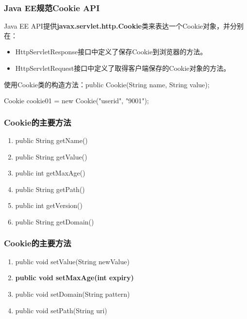 \begin{frame}[fragile] %
\frametitle{Java EE规范Cookie API} 

Java EE API提供{\bf javax.servlet.http.Cookie}类来表达一个Cookie对象，并分别在：

\begin{itemize}
\item HttpServletResponse接口中定义了保存Cookie到浏览器的方法。
\item HttpServletRequest接口中定义了取得客户端保存的Cookie对象的方法。
\end{itemize}


使用Cookie类的构造方法：public Cookie(String name, String value);
\begin{javaCode}
Cookie cookie01 = new Cookie("userid", "9001");
\end{javaCode}
\end{frame}

\begin{frame}[fragile] %
\frametitle{Cookie的主要方法} 
\begin{enumerate}
\item public String getName()
\item public String getValue()
\item public int getMaxAge()
\item public String getPath()
\item public int getVersion()
\item public String getDomain()
\end{enumerate}
\end{frame}

\begin{frame}[fragile] %
\frametitle{Cookie的主要方法} 
\begin{enumerate}
\item public void setValue(String newValue)
\item {\Blue\bf public void setMaxAge(int expiry)}
\item public void setDomain(String pattern)
\item public void setPath(String uri)
\end{enumerate}
\end{frame}

